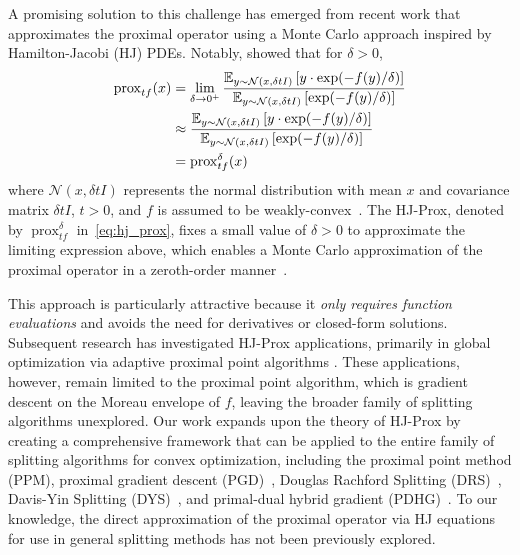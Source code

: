 \documentclass{article}
\newcommand{\prox}{\operatorname{prox}}
\newcommand{\hjprox}{\operatorname{prox}^{\delta}}
\theoremstyle{plain}
\theoremstyle{definition}
\theoremstyle{remark}
\begin{document}
A promising solution to this challenge has emerged from recent work that approximates the proximal operator using a Monte Carlo approach inspired by Hamilton-Jacobi (HJ) PDEs. Notably, \citep{OsherHeatonFung2023} showed that for $\delta >0$,
\begin{align}
    \prox_{tf}(x)   
    &=  \lim_{\delta \to 0^+}\frac{\mathbb{E}_{y \sim \mathnormal{\mathcal{N}(x,\delta t I)}}\left[y \cdot\exp(-f(y)/\delta)\right]}{\mathbb{E}_{y \sim \mathnormal{\mathcal{N}(x,\delta t I)}}\left[\exp(-f(y)/\delta)\right]}
    \\
    &\approx  \frac{\mathbb{E}_{y \sim \mathnormal{\mathcal{N}(x,\delta t I)}}\left[y \cdot\exp(-f(y)/\delta)\right]}{\mathbb{E}_{y \sim \mathnormal{\mathcal{N}(x,\delta t I)}}\left[\exp(-f(y)/\delta)\right]}
    \\
    &= \hjprox_{tf}(x) \label{eq:hj_prox}
\end{align}
where $\mathcal{N}(x, \delta t I)$ represents the normal distribution with mean $x$ and covariance matrix $\delta t I$, $t > 0$, and $f$ is assumed to be weakly-convex~\cite{ryu2022large}. The HJ-Prox, denoted by $\hjprox_{tf}$ in~\eqref{eq:hj_prox}, fixes a small value of $\delta > 0$ to approximate the limiting expression above, which enables a Monte Carlo approximation of the proximal operator in a zeroth-order manner~\cite{OsherHeatonFung2023, tibshirani2025laplace, meng2025recent, zhang2025thinking}. 

This approach is particularly attractive because it \emph{only requires function evaluations} and avoids the need for derivatives or closed-form solutions.
Subsequent research has investigated HJ-Prox applications, primarily in global optimization via adaptive proximal point algorithms \cite{heaton2024global, ZhangEtAl2024}. 
These applications, however, remain limited to the proximal point algorithm, which is gradient descent on the Moreau envelope of $f$, leaving the broader family of splitting algorithms unexplored.
Our work expands upon the theory of HJ-Prox by creating a comprehensive framework that can be applied to the entire family of splitting algorithms for convex optimization, including the proximal point method (PPM), proximal gradient descent (PGD)~\cite{rockafellar1970convex, ryu2022large}, Douglas Rachford Splitting (DRS)~\cite{lions1979splitting, eckstein1992douglas}, Davis-Yin Splitting (DYS)~\cite{DavisYin2015}, and primal-dual hybrid gradient (PDHG)~\cite{ChambollePock2011}. To our knowledge, the direct approximation of the proximal operator via HJ equations for use in general splitting methods has not been previously explored.
\end{document}
